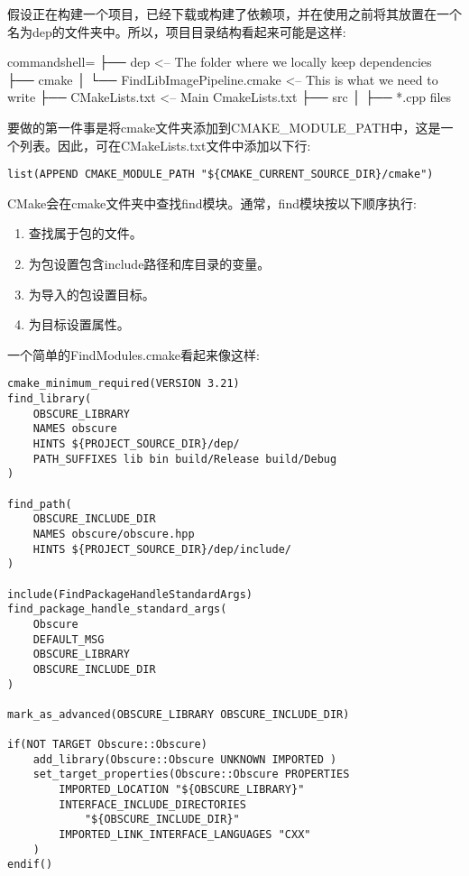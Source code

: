 假设正在构建一个项目，已经下载或构建了依赖项，并在使用之前将其放置在一个名为dep的文件夹中。所以，项目目录结构看起来可能是这样:

\begin{tcblisting}{commandshell={}}
├── dep <-- The folder where we locally keep dependencies
├── cmake
│       └── FindLibImagePipeline.cmake <-- This is what we need to write
├── CMakeLists.txt <-- Main CmakeLists.txt
├── src
│       ├── *.cpp files
\end{tcblisting}

要做的第一件事是将cmake文件夹添加到CMAKE\_MODULE\_PATH中，这是一个列表。因此，可在CMakeLists.txt文件中添加以下行:

\begin{lstlisting}[style=styleCMake]
list(APPEND CMAKE_MODULE_PATH "${CMAKE_CURRENT_SOURCE_DIR}/cmake")
\end{lstlisting}

CMake会在cmake文件夹中查找find模块。通常，find模块按以下顺序执行:

\begin{enumerate}
\item 
查找属于包的文件。
	
\item 
为包设置包含include路径和库目录的变量。

\item 
为导入的包设置目标。

\item 
为目标设置属性。
\end{enumerate}

一个简单的FindModules.cmake看起来像这样:

\begin{lstlisting}[style=styleCMake]
cmake_minimum_required(VERSION 3.21)
find_library(
	OBSCURE_LIBRARY
	NAMES obscure
	HINTS ${PROJECT_SOURCE_DIR}/dep/
	PATH_SUFFIXES lib bin build/Release build/Debug
)

find_path(
	OBSCURE_INCLUDE_DIR
	NAMES obscure/obscure.hpp
	HINTS ${PROJECT_SOURCE_DIR}/dep/include/
)

include(FindPackageHandleStandardArgs)
find_package_handle_standard_args(
	Obscure
	DEFAULT_MSG
	OBSCURE_LIBRARY
	OBSCURE_INCLUDE_DIR
)

mark_as_advanced(OBSCURE_LIBRARY OBSCURE_INCLUDE_DIR)

if(NOT TARGET Obscure::Obscure)
	add_library(Obscure::Obscure UNKNOWN IMPORTED )
	set_target_properties(Obscure::Obscure PROPERTIES
		IMPORTED_LOCATION "${OBSCURE_LIBRARY}"
		INTERFACE_INCLUDE_DIRECTORIES
			"${OBSCURE_INCLUDE_DIR}"
		IMPORTED_LINK_INTERFACE_LANGUAGES "CXX"
	)
endif()
\end{lstlisting}

